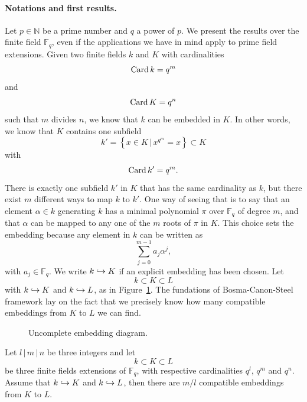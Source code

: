 \paragraph{Notations and first results.} Let $p\in\mathbb{N}$ be a prime number
and $q$ a power of $p$. We present the results over the finite field
$\mathbb{F}_q$, even if the applications we have in mind apply to prime field
extensions. Given two finite fields $k$ and $K$ with cardinalities
\[
  \operatorname{Card} k = q^m
\]
and
\[
  \operatorname{Card} K =  q^n
\]
such that $m$ divides $n$, we know that $k$ can be embedded in $K$. In other
words, we know that $K$ contains one subfield
\[
  k'=\left\{ x\in K\,|\,x^{q^m}=x \right\}\subset K
\]
with 
\[
  \operatorname{Card} k' = q^m.
\]
There is exactly one subfield $k'$ in $K$ that has the same cardinality as $k$,
but there exist $m$ different ways to map $k$ to $k'$. One way of seeing that is
to say that an element $\alpha\in k$ generating $k$ has a minimal polynomial
$\pi$ over $\mathbb{F}_q$ of degree $m$, and that $\alpha$ can be mapped to any
one of the $m$ roots of $\pi$ in $K$. This choice sets the embedding because any
element in $k$ can be written as
\[
  \sum_{j=0}^{m-1}a_j \alpha^j,
\]
with $a_j\in\mathbb{F}_q$. We write $k\hookrightarrow K$ if an explicit embedding has been
chosen. Let
\[
  k\subset K\subset L
\]
with $k\hookrightarrow K$ and $k\hookrightarrow L$, as in Figure~\ref{fig:uncomplete}. The fundations
of Bosma-Canon-Steel framework lay on the fact that we precisely know how many
compatible embeddings from $K$ to $L$ we can find.
\begin{figure}%
  \centering
\caption{Uncomplete embedding diagram.}
\label{fig:uncomplete}
\end{figure}
\begin{prop}
  \label{prop:number-embeddings}
  Let $l\,|\,m\,|\,n$ be three integers and let
  \[
    k\subset K\subset L
  \]
  be three finite fields extensions of $\mathbb{F}_q$, with respective
  cardinalities $q^l$, $q^m$ and $q^n$. Assume that $k\hookrightarrow K$ and $k\hookrightarrow L$,
  then there are $m/l$ compatible embeddings from $K$ to $L$.
\end{prop}
